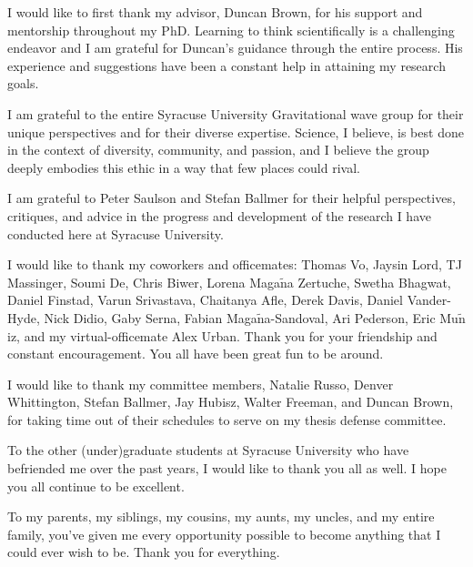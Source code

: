 I would like to first thank my advisor, Duncan Brown, for his support and mentorship throughout my PhD. Learning
to think scientifically is a challenging endeavor and I am grateful for Duncan's guidance through
the entire process. His experience and suggestions have been a constant help in attaining my research goals.

I am grateful to the entire Syracuse University Gravitational wave group for their unique perspectives and for their
diverse expertise. Science, I believe, is best done in the context of diversity, community, and passion, and I believe
the group deeply embodies this ethic in a way that few places could rival.

I am grateful to Peter Saulson and Stefan Ballmer for their helpful perspectives, critiques, and advice in the
progress and development of the research I have conducted here at Syracuse University.%

I would like to thank my coworkers and officemates: Thomas Vo, Jaysin Lord, TJ Massinger, Soumi De, Chris Biwer,
Lorena Maga$\tilde{\text{n}}$a Zertuche, Swetha Bhagwat, Daniel Finstad, Varun Srivastava,
Chaitanya Afle, Derek Davis, Daniel Vander-Hyde, Nick Didio, Gaby Serna,
Fabian Maga$\tilde{\text{n}}$a-Sandoval, Ari Pederson, Eric Mu$\tilde{\text{n}}$iz, and my virtual-officemate Alex Urban.
Thank you for your friendship and constant encouragement. You all have been great fun to be around.


I would like to thank my committee members, Natalie Russo, Denver Whittington, Stefan Ballmer, Jay Hubisz, Walter Freeman, 
and Duncan Brown, for taking time out of their schedules to serve on my thesis defense committee.

To the other (under)graduate students at Syracuse University who have befriended me over the past years, I would
like to thank you all as well. I hope you all continue to be excellent. 

To my parents, my siblings, my cousins, my aunts, my uncles, and my entire family, you've given me every opportunity
possible to become anything that I could ever wish to be. Thank you for everything.
